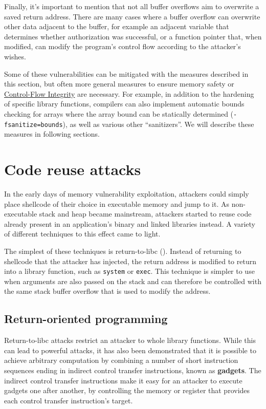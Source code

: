 \documentclass[
  a4paper,
]{report}
\begin{document}
Finally, it's important to mention that not all buffer overflows aim to
overwrite a saved return address. There are many cases where a buffer
overflow can overwrite other data adjacent to the buffer, for example an
adjacent variable that determines whether authorization was successful,
or a function pointer that, when modified, can modify the program's
control flow according to the attacker's wishes.

Some of these vulnerabilities can be mitigated with the measures
described in this section, but often more general measures to ensure
memory safety or \hyperref[control-flow-integrity-cfi]{Control-Flow
Integrity} are necessary. For example, in addition to the hardening of
specific library functions, compilers can also implement automatic
bounds checking for arrays where the array bound can be statically
determined (\texttt{-fsanitize=bounds}), as well as various other
``sanitizers''. We will describe these measures in following sections.

\section{Code reuse attacks}\label{code-reuse-attacks}

In the early days of memory vulnerability exploitation, attackers could
simply place shellcode of their choice in executable
memory and jump to it. As non-executable stack and heap became
mainstream, attackers started to reuse code already present in an
application's binary and linked libraries instead. A variety of
different techniques to this effect came to light.

The simplest of these techniques is return-to-libc
(). Instead of returning to
shellcode that the attacker has injected, the return address is modified
to return into a library function, such as \texttt{system} or
\texttt{exec}. This technique is simpler to use when arguments are also
passed on the stack and can therefore be controlled with the same stack
buffer overflow that is used to modify the address.

\subsection{Return-oriented
programming}\label{return-oriented-programming}

Return-to-libc attacks restrict an attacker to whole library functions.
While this can lead to powerful attacks, it has also been demonstrated
that it is possible to achieve arbitrary computation by combining a
number of short instruction sequences ending in indirect control
transfer instructions, known as \textbf{gadgets}. The
indirect control transfer instructions make it easy for an attacker to
execute gadgets one after another, by controlling the memory or register
that provides each control transfer instruction's target.
\end{document}
